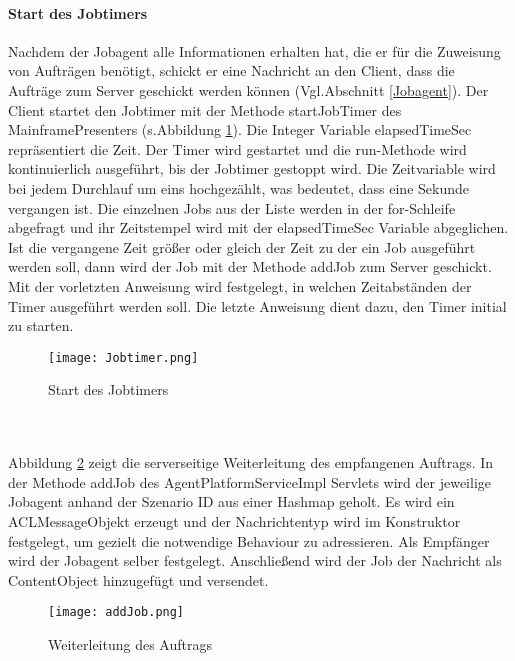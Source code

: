 \paragraph{Start des Jobtimers} 
Nachdem der Jobagent alle Informationen erhalten hat, die er für die Zuweisung von Aufträgen benötigt, schickt er eine Nachricht an den Client, dass die Aufträge zum Server geschickt werden können (Vgl.Abschnitt \ref{Jobagent}). Der Client startet den Jobtimer mit der Methode startJobTimer des MainframePresenters (s.Abbildung \ref{jobtim}). Die Integer Variable elapsedTimeSec repräsentiert die Zeit. Der Timer wird gestartet und die run-Methode wird kontinuierlich ausgeführt, bis der Jobtimer gestoppt wird. Die Zeitvariable wird bei jedem Durchlauf um eins hochgezählt, was bedeutet, dass eine Sekunde vergangen ist. Die einzelnen Jobs aus der Liste werden in der for-Schleife abgefragt und ihr Zeitstempel wird mit der elapsedTimeSec Variable abgeglichen. Ist die vergangene Zeit größer oder gleich der Zeit zu der ein Job ausgeführt werden soll, dann wird der Job mit der Methode addJob zum Server geschickt. Mit der vorletzten Anweisung wird festgelegt, in welchen Zeitabständen der Timer ausgeführt werden soll. Die letzte Anweisung dient dazu, den Timer initial zu starten.
\begin{figure}[h!]
	\centering
		\texttt{[image: Jobtimer.png]}        
		\caption{Start des Jobtimers}
	\label{jobtim}
\end{figure}
\\\\
Abbildung \ref{jobtimserv} zeigt die serverseitige Weiterleitung des empfangenen Auftrags. In der Methode addJob des AgentPlatformServiceImpl Servlets wird der jeweilige Jobagent anhand der Szenario ID aus einer Hashmap geholt. Es wird ein ACLMessageObjekt erzeugt und der Nachrichtentyp wird im Konstruktor festgelegt, um gezielt die notwendige Behaviour zu adressieren. Als Empfänger wird der Jobagent selber festgelegt. Anschließend wird der Job der Nachricht als ContentObject hinzugefügt und versendet.
\begin{figure}[h!]
	\centering
		\texttt{[image: addJob.png]}        
		\caption{Weiterleitung des Auftrags}
	\label{jobtimserv}
\end{figure}
